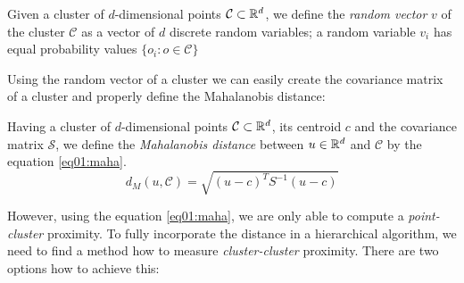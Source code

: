 \begin{defn}
	Given a cluster of $d$-dimensional points $\mathcal{C} \subset \mathbb{R}^d$, we define the \emph{random vector} $v$ of the cluster $\mathcal{C}$ as a vector of $d$ discrete random variables; a random variable $v_i$ has equal probability values $\{o_i:o\in \mathcal{C}\}$
\end{defn}

Using the random vector of a cluster we can easily create the covariance matrix of a cluster and properly define the Mahalanobis distance:

\begin{defn}
	Having a cluster of $d$-dimensional points $\mathcal{C} \subset \mathbb{R}^d$, its centroid $c$ and the covariance matrix $\mathcal{S}$, we define the \emph{Mahalanobis distance} between $u \in \mathbb{R}^d$ and $\mathcal{C}$ by the equation \ref{eq01:maha}.
	\begin{equation}\label{eq01:maha}
	d_M(u,\mathcal{C}) = \sqrt{(u-c)^TS^{-1}(u-c)}
	\end{equation}
	\label{def01:maha}
\end{defn}


However, using the equation \ref{eq01:maha}, we are only able to compute a \emph{point-cluster} proximity. To fully incorporate the distance in a hierarchical algorithm, we need to find a method how to measure \emph{cluster-cluster} proximity. There are two options how to achieve this:

